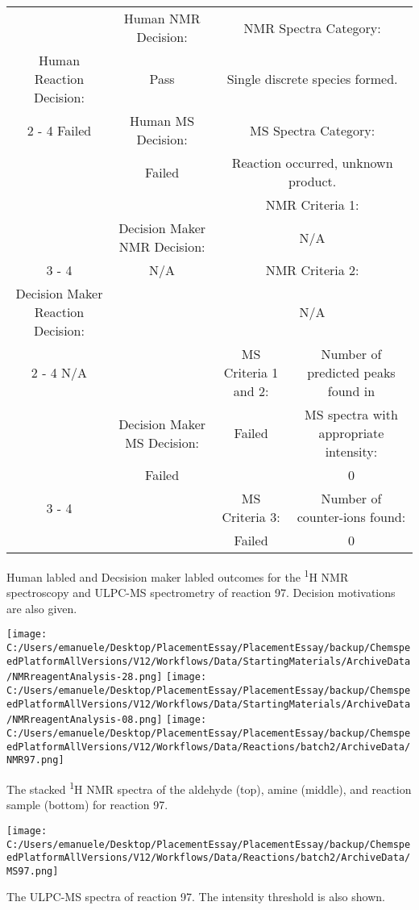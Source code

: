 \documentclass{article}%
\begin{document}
\begin{Decision Table}[H]%
\begin{tabular}{|c|c|c|c|}%
\hline%
&Human NMR Decision:&\multicolumn{2}{|c|}{NMR Spectra Category:}\\%
Human Reaction Decision:&Pass&\multicolumn{2}{|c|}{Single discrete species formed.}\\%
\cline{2%
-%
4}%
Failed&Human MS Decision:&\multicolumn{2}{|c|}{MS Spectra Category:}\\%
&Failed&\multicolumn{2}{|c|}{Reaction occurred, unknown product.}\\%
\hline%
&&\multicolumn{2}{|c|}{NMR Criteria 1:}\\%
&Decision Maker NMR Decision:&\multicolumn{2}{|c|}{N/A}\\%
\cline{3%
-%
4}%
&N/A&\multicolumn{2}{|c|}{NMR Criteria 2:}\\%
Decision Maker Reaction Decision:&&\multicolumn{2}{|c|}{N/A}\\%
\cline{2%
-%
4}%
N/A&&MS Criteria 1 and 2:&Number of predicted peaks found in\\%
&Decision Maker MS Decision:&Failed&MS spectra with appropriate intensity:\\%
&Failed&&0\\%
\cline{3%
-%
4}%
&&MS Criteria 3:&Number of counter{-}ions found:\\%
&&Failed&0\\%
\hline%
\end{tabular}%
\caption{Human labled and Decsision maker labled outcomes for the \textsuperscript{1}H NMR spectroscopy and ULPC-MS spectrometry of reaction 97. Decision motivations are also given.}%
\end{Decision Table}%
\begin{NMR Spectra}[H]%
\begin{center}%
\texttt{[image: C:/Users/emanuele/Desktop/PlacementEssay/PlacementEssay/backup/ChemspeedPlatformAllVersions/V12/Workflows/Data/StartingMaterials/ArchiveData/NMRreagentAnalysis-28.png]}\hfill%
\texttt{[image: C:/Users/emanuele/Desktop/PlacementEssay/PlacementEssay/backup/ChemspeedPlatformAllVersions/V12/Workflows/Data/StartingMaterials/ArchiveData/NMRreagentAnalysis-08.png]}\hfill%
\texttt{[image: C:/Users/emanuele/Desktop/PlacementEssay/PlacementEssay/backup/ChemspeedPlatformAllVersions/V12/Workflows/Data/Reactions/batch2/ArchiveData/NMR97.png]}\hfill%
\end{center}%
\caption{The stacked \textsuperscript{1}H NMR spectra of the aldehyde (top), amine (middle), and reaction sample (bottom) for reaction 97.}%
\end{NMR Spectra}%
\begin{MS Spectra}[H]%
\begin{center}%
\texttt{[image: C:/Users/emanuele/Desktop/PlacementEssay/PlacementEssay/backup/ChemspeedPlatformAllVersions/V12/Workflows/Data/Reactions/batch2/ArchiveData/MS97.png]}\hfill%
\end{center}%
\caption{The ULPC-MS spectra of reaction 97. The intensity threshold is also shown.}%
\end{MS Spectra}%
\end{document}
